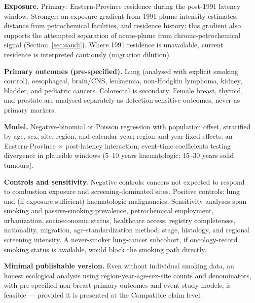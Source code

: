 \documentclass[3p,times]{elsarticle}
\begin{document}
\textbf{Exposure.} Primary: Eastern-Province residence during the post-1991 latency window. Stronger: an exposure gradient from 1991 plume-intensity estimates, distance from petrochemical facilities, and residence history; this gradient also supports the attempted separation of acute-plume from chronic-petrochemical signal (Section~\ref{sec:saudi}). Where 1991 residence is unavailable, current residence is interpreted cautiously (migration dilution).

\textbf{Primary outcomes (pre-specified).} Lung (analysed with explicit smoking control), oesophageal, brain/CNS, leukaemia, non-Hodgkin lymphoma, kidney, bladder, and pediatric cancers. Colorectal is secondary. Female breast, thyroid, and prostate are analysed separately as detection-sensitive outcomes, never as primary markers.

\textbf{Model.} Negative-binomial or Poisson regression with population offset, stratified by age, sex, site, region, and calendar year; region and year fixed effects; an Eastern-Province $\times$ post-latency interaction; event-time coefficients testing divergence in plausible windows (5--10 years haematologic; 15--30 years solid tumours).

\textbf{Controls and sensitivity.} Negative controls: cancers not expected to respond to combustion exposure and screening-dominated sites. Positive controls: lung and (if exposure sufficient) haematologic malignancies. Sensitivity analyses span smoking and passive-smoking prevalence, petrochemical employment, urbanization, socioeconomic status, healthcare access, registry completeness, nationality, migration, age-standardization method, stage, histology, and regional screening intensity. A never-smoker lung-cancer subcohort, if oncology-record smoking status is available, would block the smoking path directly.

\textbf{Minimal publishable version.} Even without individual smoking data, an honest ecological analysis using region-year-age-sex-site counts and denominators, with pre-specified non-breast primary outcomes and event-study models, is feasible --- provided it is presented at the Compatible claim level.
\end{document}
